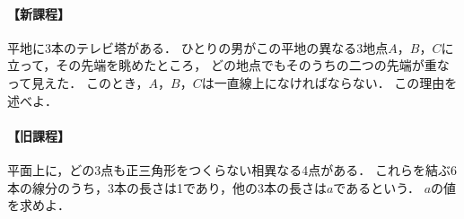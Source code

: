 \documentclass[../../main.tex]{subfiles}
\begin{document}
\paragraph{【新課程】}
平地に3本のテレビ塔がある．
ひとりの男がこの平地の異なる3地点$A$，$B$，$C$に立って，その先端を眺めたところ，
どの地点でもそのうちの二つの先端が重なって見えた．
このとき，$A$，$B$，$C$は一直線上になければならない．
この理由を述べよ．

\paragraph{【旧課程】}
平面上に，どの3点も正三角形をつくらない相異なる4点がある．
これらを結ぶ6本の線分のうち，3本の長さは1であり，他の3本の長さは$a$であるという．
$a$の値を求めよ．
\end{document}
